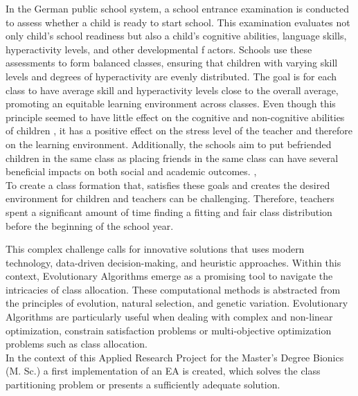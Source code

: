 \begin{onehalfspace}
 In the German public school system, a school entrance examination is conducted to assess whether 
 a child is ready to start school. This examination evaluates not only child's school readiness but also 
 a child's cognitive abilities, language skills, hyperactivity levels, and other developmental f
 actors. Schools use these assessments to form balanced classes, ensuring that children with 
 varying skill levels and degrees of hyperactivity are evenly distributed. The goal is for each 
 class to have average skill and hyperactivity levels close to the overall average, promoting an 
 equitable learning environment across classes. Even though this principle seemed to have little effect on the 
 cognitive and non-cognitive abilities of children \citep{schneider2013school}, 
 it has a positive effect on the stress level of the teacher and therefore 
 on the learning environment. Additionally, the schools aim to put befriended children in the 
 same class as placing friends in the same class can have several beneficial 
 impacts on both social and academic outcomes. \citep{hallinan1978classroom}, 
 \\
 
To create a class formation that, satisfies these goals and creates the desired environment for children and teachers can 
be challenging. Therefore, teachers spent a significant amount of time finding a fitting and 
 fair class distribution before the beginning of the school year. 

This complex challenge calls for innovative solutions that uses modern technology, 
data-driven decision-making, and heuristic approaches. Within this context, Evolutionary 
Algorithms emerge as a promising tool to navigate the intricacies of class allocation. 
These computational methods is abstracted from the principles of evolution, natural selection, 
and genetic variation. Evolutionary Algorithms are particularly useful when dealing with complex 
and non-linear optimization, constrain satisfaction problems or multi-objective optimization problems 
such as class allocation.
\\

In the context of this Applied Research Project for the Master's Degree Bionics 
(M. Sc.) a first implementation of an EA is created, which solves the class partitioning 
problem or presents a sufficiently adequate solution.


\end{onehalfspace}
